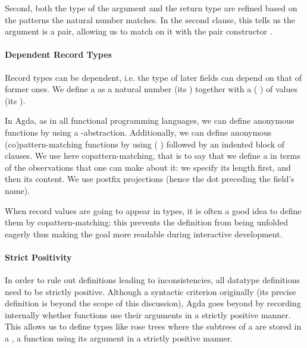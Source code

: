Second, both the type of the  argument and the  return type
are refined based on the patterns the natural number matches. In the second clause,
this tells us the  argument is a pair, allowing us to match on it with
the pair constructor \AIC{\_,\_}.


\paragraph{Dependent Record Types}

Record types can be dependent, i.e. the type of later fields can depend on that of
former ones. We define a  as a natural number (its ) together
with a ( ) of values (its ).


In Agda, as in all functional programming languages, we can define anonymous functions
by using a -abstraction. Additionally, we can define anonymous (co)pattern-matching
functions by using ( ) followed by an indented block of clauses.
We use here copattern-matching, that is to say that we define a  in terms
of the observations that one can make about it: we specify its length first, and
then its content. We use postfix projections (hence the dot preceding the field's name).


When record values are going to appear in types, it is often a good idea to define
them by copattern-matching: this prevents the definition from being unfolded eagerly
thus making the goal more readable during interactive development.

\paragraph{Strict Positivity} In order to rule out definitions leading to
inconsistencies, all datatype definitions need to be strictly positive.
Although a syntactic criterion originally (its precise definition is beyond
the scope of this discussion), Agda goes beyond by recording internally
whether functions use their arguments in a strictly positive manner.
This allows us to define types like rose trees where the subtrees of a
 are stored in a , a function using its 
argument in a strictly positive manner.

